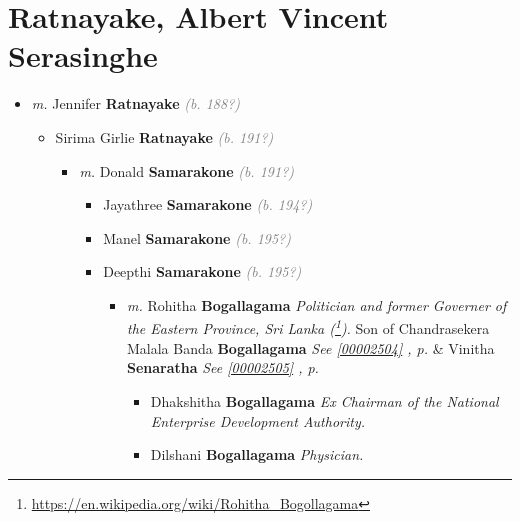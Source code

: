 \documentclass[10pt, openany]{book}
\begin{document}
\chapter{Ratnayake, Albert Vincent Serasinghe}
\label{00000641}
\textcolor{slmaroon}{\textit{}}
\begin{itemize}
\item{\textit{m.} Jennifer \textbf{Ratnayake} \textcolor{gray}{\textit{(b. 188?)}}   \label{couple:00000641:00000642} \begin{itemize}
\item{Sirima Girlie \textbf{Ratnayake} \textcolor{gray}{\textit{(b. 191?)}}
\begin{itemize}
\item{\textit{m.} Donald \textbf{Samarakone} \textcolor{gray}{\textit{(b. 191?)}}   \label{couple:00000658:00000672} \begin{itemize}
\item{Jayathree \textbf{Samarakone} \textcolor{gray}{\textit{(b. 194?)}}
 }
\item{Manel \textbf{Samarakone} \textcolor{gray}{\textit{(b. 195?)}}
 }
\item{Deepthi \textbf{Samarakone} \textcolor{gray}{\textit{(b. 195?)}}
\begin{itemize}
\item{\textit{m.} Rohitha \textbf{Bogallagama} \textcolor{slorange}{\textit{}} \textcolor{slmaroon}{\textit{Politician and former Governer of the Eastern Province, Sri Lanka (\footnote{\url{https://en.wikipedia.org/wiki/Rohitha_Bogollagama}}).}} Son of  Chandrasekera Malala Banda \textbf{Bogallagama} \textcolor{slorange}{\textit{}} \textcolor{slteal}{\textit{See  \autoref{00002504} \textit{, p. \pageref{00002504} }}}  \&  Vinitha \textbf{Senaratha} \textcolor{slorange}{\textit{}} \textcolor{slteal}{\textit{See  \autoref{00002505} \textit{, p. \pageref{00002505} }}}   \label{couple:00000123:00000671} \begin{itemize}
\item{Dhakshitha \textbf{Bogallagama} \textcolor{slorange}{\textit{}} \textcolor{slmaroon}{\textit{Ex Chairman of the National Enterprise Development Authority.}}
 }
\item{Dilshani \textbf{Bogallagama} \textcolor{slorange}{\textit{}} \textcolor{slmaroon}{\textit{Physician.}}
 }
\end{itemize}}
\end{itemize}
}
\end{itemize}}
\end{itemize}}
\end{itemize}}
\end{itemize}
\end{document}
